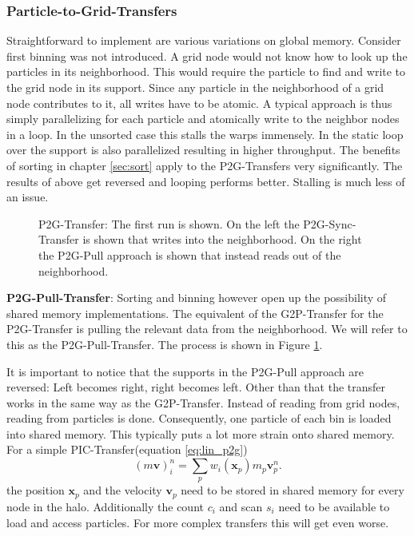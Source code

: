 \documentclass[m,times]{cgMA}
\begin{document}
\subsubsection{Particle-to-Grid-Transfers}\label{sec:p2g}
Straightforward to implement are various variations on global memory. Consider first binning was not introduced. A grid node would not know how to look up the particles in its neighborhood. This would require the particle to find and write to the grid node in its support. Since any particle in the neighborhood of a grid node contributes to it, all writes have to be atomic. A typical approach is thus simply parallelizing for each particle and atomically write to the neighbor nodes in a loop. In the unsorted case this stalls the warps immensely. In \cite{Meyer2015} the static loop over the support is also parallelized resulting in higher throughput. The benefits of sorting in chapter \ref{sec:sort} apply to the P2G-Transfers very significantly. The results of above get reversed and looping performs better. Stalling is much less of an issue.

\begin{figure}[t]
    \centering
  
  \caption{P2G-Transfer: The first run is shown. On the left the P2G-Sync-Transfer is shown that writes into the neighborhood. On the right the P2G-Pull approach is shown that instead reads out of the neighborhood.}
  \label{fig:p2g_transfer}
\end{figure}

\textbf{P2G-Pull-Transfer}: Sorting and binning however open up the possibility of shared memory implementations. The equivalent of the G2P-Transfer for the P2G-Transfer is pulling the relevant data from the neighborhood. We will refer to this as the P2G-Pull-Transfer. The process is shown in Figure \ref{fig:p2g_transfer}.

It is important to notice that the supports in the P2G-Pull approach are reversed: Left becomes right, right becomes left. Other than that the transfer works in the same way as the G2P-Transfer. Instead of reading from grid nodes, reading from particles is done. Consequently, one particle of each bin is loaded into shared memory. This typically puts a lot more strain onto shared memory. For a simple PIC-Transfer(equation \ref{eq:lin_p2g})
$$
(m\boldsymbol{v})_i^n = \sum_p w_{i}(\boldsymbol{x}_p)m_p\boldsymbol{v}^n_p.
$$
the position $\boldsymbol{x}_p$ and the velocity $\boldsymbol{v}_p$ need to be stored in shared memory for every node in the halo. Additionally the count $c_i$ and scan $s_i$ need to be available to load and access particles. For more complex transfers this will get even worse.
\end{document}

